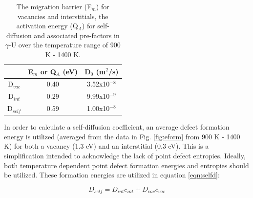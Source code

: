 \documentclass[review]{elsarticle}
\begin{document}
\FloatBarrier

\begin{table}[h]
\caption{The migration barrier (E$_m$) for vacancies and interstitials, the activation energy (Q$_A$) for self-diffusion and associated pre-factors in $\gamma$-U over the temperature range of 900 K - 1400 K.}  \label{tab:diff}
\begin{center}
\begin{tabular}{|c|c|c|}
	\hline
	 & E$_m$ or Q$_A$ (eV) & D$_0$ (m$^2$/s) \\
	 \hline
	 D$_{vac}$ & 0.40 & 3.52x10$^{-8}$ \\
	 D$_{int}$ & 0.29 & 9.99x10$^{-9}$ \\
	 D$_{self}$ & 0.59 & 1.00x10$^{-8}$ \\
	 \hline
\end{tabular}
\end{center}
\label{default}
\end{table}

In order to calculate a self-diffusion coefficient, an average defect formation energy is utilized (averaged from the data in Fig. \ref{fig:eform} from 900 K - 1400 K) for both a vacancy (1.3 eV) and an interstitial (0.3 eV). This is a simplification intended to acknowledge the lack of point defect entropies. Ideally, both temperature dependent point defect formation energies and entropies should be utilized. These formation energies are utilized in equation \ref{eqn:selfd}:

\begin{equation}
\label{eqn:selfd}
D_{self} = D_{int}c_{int} + D_{vac}c_{vac}
\end{equation} 
\end{document}
